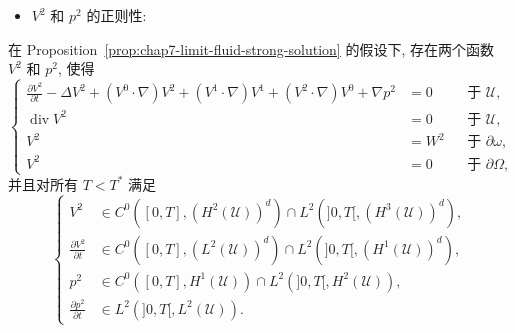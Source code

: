 \begin{sloppypar}
\begin{itemize}
\item $V^2$ 和 $p^2$ 的正则性:
\end{itemize}

\begin{Proposition}
\label{prop:chap7-V2-profile-wellposedness}
在 Proposition~\ref{prop:chap7-limit-fluid-strong-solution} 的假设下, 存在两个函数 $V^2$ 和 $p^2$, 使得
\[
\left\{
\begin{aligned}
 \frac{\partial V^2}{\partial t}-\Delta V^2+(V^0\cdot\nabla)V^2
 +(V^1\cdot\nabla)V^1+(V^2\cdot\nabla)V^0+\nabla p^2&=0&&\text{于 }\mathcal U,\\
 \operatorname{div}V^2&=0&&\text{于 }\mathcal U,\\
 V^2&=W^2&&\text{于 }\partial\omega,\\
 V^2&=0&&\text{于 }\partial\Omega,
\end{aligned}
\right.
\]
并且对所有 $T<T^*$ 满足
\[
\left\{
\begin{aligned}
 V^2&\in C^0([0,T],(H^2(\mathcal U))^d)\cap L^2(]0,T[,(H^3(\mathcal U))^d),\\
 \frac{\partial V^2}{\partial t}&\in C^0([0,T],(L^2(\mathcal U))^d)\cap L^2(]0,T[,(H^1(\mathcal U))^d),\\
 p^2&\in C^0([0,T],H^1(\mathcal U))\cap L^2(]0,T[,H^2(\mathcal U)),\\
 \frac{\partial p^2}{\partial t}&\in L^2(]0,T[,L^2(\mathcal U)).
\end{aligned}
\right.
\]
\end{Proposition}


\end{sloppypar}
